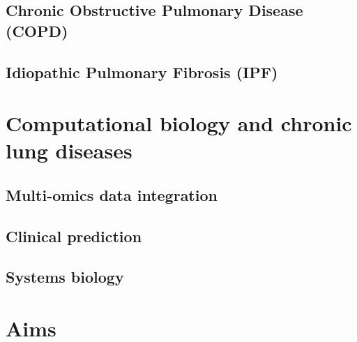     \subsection{Chronic Obstructive Pulmonary Disease (COPD)}
    \subsection{Idiopathic Pulmonary Fibrosis (IPF)}

\section{Computational biology and chronic lung diseases}
    \subsection{Multi-omics data integration}
    \subsection{Clinical prediction}
    \subsection{Systems biology}
    
\section{Aims}
